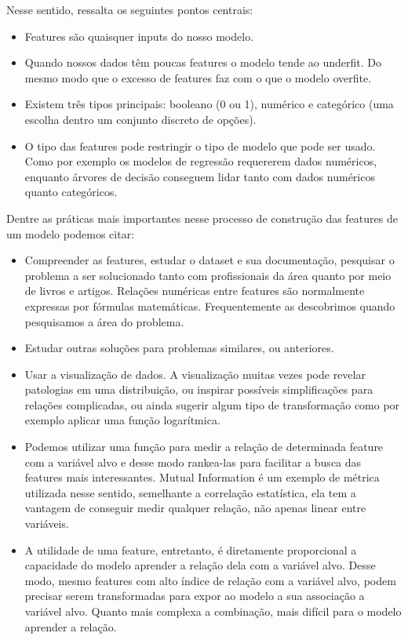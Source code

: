 Nesse sentido, \cite{SCRATCH} ressalta os seguintes pontos centrais:
\begin{itemize}
\item Features são quaisquer inputs do nosso modelo. 
\item Quando nossos dados têm poucas features o modelo tende ao underfit. Do mesmo modo que o excesso de features faz com o que o modelo overfite. 
\item Existem três tipos principais: booleano (0 ou 1), numérico e categórico (uma escolha dentro um conjunto discreto de opções).
\item O tipo das features pode restringir o tipo de modelo que pode ser usado. Como por exemplo os modelos de regressão requererem dados numéricos, enquanto árvores de decisão conseguem lidar tanto com dados numéricos quanto categóricos.
\end{itemize}

Dentre as práticas mais importantes nesse processo de construção das features de um modelo podemos citar:
\begin{itemize}
\item Compreender as features, estudar o dataset e sua documentação, pesquisar o problema a ser solucionado tanto com profissionais da área quanto por meio de livros e artigos. Relações numéricas entre features são normalmente expressas por fórmulas matemáticas. Frequentemente as descobrimos quando pesquisamos a área do problema.
\item Estudar outras soluções para problemas similares, ou anteriores.
\item Usar a visualização de dados. A visualização muitas vezes pode revelar patologias em uma distribuição, ou inspirar possíveis simplificações para relações complicadas, ou ainda sugerir algum tipo de transformação como por exemplo aplicar uma função logarítmica. 
\item Podemos utilizar uma função para medir a relação de determinada feature com a variável alvo e desse modo rankea-las para facilitar a busca das  features mais interessantes. Mutual Information é um exemplo de métrica utilizada nesse sentido, semelhante a correlação estatística, ela tem a vantagem de conseguir medir qualquer relação, não apenas linear entre variáveis. 
\item A utilidade de uma feature, entretanto, é diretamente proporcional a capacidade do modelo aprender a relação dela com a variável alvo. Desse modo, mesmo features com alto índice de relação com a variável alvo, podem precisar serem transformadas para expor ao modelo a sua associação a variável alvo. Quanto mais complexa a combinação, mais difícil para o modelo aprender a relação.
\end{itemize}

